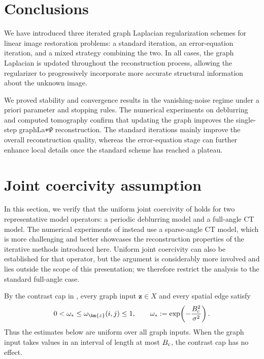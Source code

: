 \documentclass{article}
\theoremstyle{remark}
\newcommand{\bz}{{\bm{z}}}
\begin{document}
\section*{Conclusions}
We have introduced three iterated graph Laplacian regularization schemes for linear image restoration problems: a standard iteration, an error-equation iteration, and a mixed strategy combining the two. In all cases, the graph Laplacian is updated throughout the reconstruction process, allowing the regularizer to progressively incorporate more accurate structural information about the unknown image.

We proved stability and convergence results in the vanishing-noise regime under a priori parameter and stopping rules. The numerical experiments on deblurring and computed tomography confirm that updating the graph improves the single-step graphLa\texttt{+}$\Psi$ reconstruction. The standard iterations mainly improve the overall reconstruction quality, whereas the error-equation stage can further enhance local details once the standard scheme has reached a plateau.


\appendix

\section{Joint coercivity assumption}\label{sec:appendix-coercivity}

In this section, we verify that the uniform joint coercivity
 of  holds for two
representative model operators: a periodic deblurring model and a full-angle CT
model. The numerical experiments of  instead use a
sparse-angle CT model, which is more challenging and better showcases the
reconstruction properties of the iterative methods introduced here. Uniform
joint coercivity can also be established for that operator, but the argument is
considerably more involved and lies outside the scope of this presentation; we
therefore restrict the analysis to the standard full-angle case.



By the contrast cap in , every graph input
$\bz\in X$ and every spatial edge satisfy
\[
0<\omega_*\le \omega_\bz(i,j)\le 1,
\qquad
\omega_*:=\exp\!\left(-\frac{B_{\rm c}^2}{\sigma^2}\right).
\]
Thus the estimates below are uniform over all graph inputs. When the graph input takes values in an interval
of length at most $B_{\rm c}$, the contrast cap has no effect.
\end{document}
